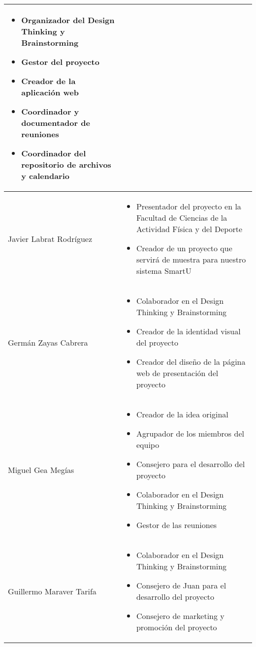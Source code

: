 \begin{longtable}{|m{4.5cm}|m{6.5cm}|}
\begin{itemize}
            \item Organizador del Design Thinking y Brainstorming
            \item Gestor del proyecto
            \item Creador de la aplicación web
            \item Coordinador y documentador de reuniones
            \item Coordinador del repositorio de archivos y calendario
        \end{itemize} \\
    \hline
        Javier Labrat Rodríguez & \begin{itemize}
            \item Presentador del proyecto en la Facultad de Ciencias de la Actividad Física y del Deporte
            \item Creador de un proyecto que servirá de muestra para nuestro sistema SmartU
        \end{itemize} \\
    \hline
        Germán Zayas Cabrera & \begin{itemize}
            \item Colaborador en el Design Thinking y Brainstorming
            \item Creador de la identidad visual del proyecto
            \item Creador del diseño de la página web de presentación del proyecto
        \end{itemize} \\
    \hline
        Miguel Gea Megías & \begin{itemize}
            \item Creador de la idea original
            \item Agrupador de los miembros del equipo
            \item Consejero para el desarrollo del proyecto
            \item Colaborador en el Design Thinking y Brainstorming
            \item Gestor de las reuniones
        \end{itemize} \\
    \hline
        Guillermo Maraver Tarifa & \begin{itemize}
            \item Colaborador en el Design Thinking y Brainstorming
            \item Consejero de Juan para el desarrollo del proyecto
            \item Consejero de marketing y promoción del proyecto

\end{itemize}
\end{longtable}
